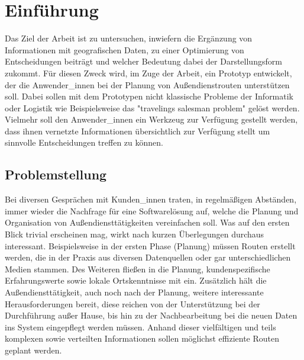 \documentclass[Bachelorarbeit.tex]{subfiles}
\begin{document}
\chapter{Einführung}
\label{chap:einfuehrung}

Das Ziel der Arbeit ist zu untersuchen, 
inwiefern die Ergänzung  von Informationen mit geografischen Daten, 
zu einer Optimierung von Entscheidungen beiträgt und welcher Bedeutung dabei der Darstellungsform zukommt. 
Für diesen Zweck wird, im Zuge der Arbeit, ein Prototyp entwickelt, der die Anwender\_innen bei der Planung von Außendienstrouten unterstützen soll. 
Dabei sollen mit dem Prototypen nicht klassische Probleme der Informatik oder Logistik wie Beispielsweise das "travelings salesman problem" gelöst werden. Vielmehr soll den Anwender\_innen ein Werkzeug zur Verfügung gestellt werden, dass ihnen vernetzte Informationen übersichtlich zur Verfügung stellt um sinnvolle Entscheidungen treffen zu können.

\section{Problemstellung}
\label{chap:einfuehrung:sec:problemstellung}

Bei diversen Gesprächen mit Kunden\_innen traten, in regelmäßigen Abständen, immer wieder die Nachfrage für eine Softwarelösung auf, welche die Planung und Organisation von Außendiensttätigkeiten vereinfachen soll. 
Was auf den ersten Blick trivial erscheinen mag, wirkt nach kurzen Überlegungen durchaus interessant. 
Beispielsweise in der ersten Phase (Planung) müssen Routen erstellt werden, die in der Praxis aus diversen Datenquellen oder gar unterschiedlichen Medien stammen. 
Des Weiteren fließen in die Planung, kundenspezifische Erfahrungswerte sowie lokale Ortskenntnisse mit ein.
Zusätzlich hält die Außendiensttätigkeit, auch noch nach der Planung, weitere interessante Herausforderungen bereit, diese reichen von der Unterstützung bei der Durchführung außer Hause,  bis hin zu der Nachbearbeitung bei die neuen Daten ins System eingepflegt werden müssen.
Anhand dieser vielfältigen und teils komplexen sowie verteilten Informationen sollen möglichst effiziente Routen geplant werden. 


\begin{comment}
Als Grundlage für den Prototypen dient die Software Pery der Firma Perfany GmbH. 
Dabei handelt es sich um 
Wobei der Fokus auf dem Ticket Modul der Software ruht. Dabei ist das Anwendungskonzept des Moduls so ausgelegt das sämtliche Aufgaben, die die Firma betreffen , einzeln als Tickets erfasst werden. 
\end{comment}
\end{document}
